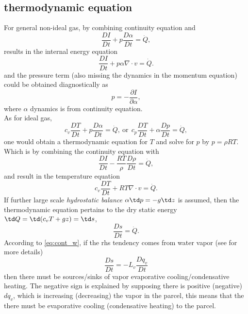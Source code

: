\subsection{thermodynamic equation}
For general {\clr non-ideal gas}, by combining continuity equation and
\begin{equation}
    \frac{DI}{Dt} + p \frac{D\alpha}{Dt} = \dot{Q}, 
\end{equation}
results in the internal energy equation
\begin{equation}
    \boxed{\frac{DI}{Dt} + p\alpha \nabla \cdot v = \dot{Q}}.
\end{equation}
and the pressure term (also missing the dynamics in the momentum equation) could be obtained
diagnostically as
\begin{equation} 
   p = -\frac{\partial I}{\partial \alpha},
\end{equation}
where $\alpha$ dynamics is from continuity equation. \\

As for {\clr ideal gas}, 
\begin{equation}
    c_v\frac{DT}{Dt} + p \frac{D\alpha}{Dt} = \dot{Q}, \ \text{or} \ \ 
    c_p\frac{DT}{Dt} + \alpha \frac{Dp}{Dt} = \dot{Q},
\end{equation}
one would obtain a thermodynamic equation for $T$ and solve for $p$ by $p = \rho R T$. Which is
by combining the continuity equation with
\begin{equation}
    \frac{DI}{Dt} - \frac{RT}{\rho} \frac{D\rho}{Dt} = \dot{Q},
\end{equation}
and result in the temperature equation
\begin{equation}
    \boxed{c_v\frac{DT}{Dt} + RT \nabla \cdot v = \dot{Q}}.
\end{equation}
If further large scale \emph{\clr hydrostatic balance} $\alpha \td p = -g \td z$ is assumed, then
the thermodynamic equation pertains to the dry static energy $\td Q = \td (c_v T + gz) = \td s$, 
\begin{equation}
   \boxed{\frac{Ds}{Dt} = \dot{Q}}.
\end{equation}
According to \eqref{eq:cont_w}, if the rhs tendency comes from water vapor (see
\cite{khairoutdinov2003cloud} for more details)
\begin{equation}
   \boxed{\frac{Ds}{Dt} = -L_v\frac{Dq_v}{Dt}}
\end{equation}
then there must be sources/sinks of vapor evaporative cooling/condensative heating.
The negative sign is explained by supposing there is positive (negative) $dq_v$, which is increasing
(decreasing) the vapor in the parcel, this means that the there must be evaporative cooling
(condensative heating) to the parcel.


